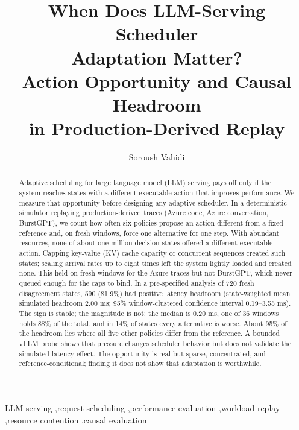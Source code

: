 \documentclass[preprint,12pt]{elsarticle}
\begin{document}
\newcommand{\anwg}{\mathrm{ANWG}}
\newcommand{\sbs}{\mathrm{SBS}}
\newcommand{\vbs}{\mathrm{VBS}}
\newcommand{\policy}[1]{\texttt{\detokenize{#1}}}

\begin{frontmatter}

\title{When Does LLM-Serving Scheduler\\
Adaptation Matter?\\
Action Opportunity and Causal Headroom\\
in Production-Derived Replay}

\author{Soroush Vahidi}

\address{Department of Computer Science, Ying Wu College of Computing,\\
New Jersey Institute of Technology, University Heights,\\
Newark, NJ 07102, USA}

\begin{abstract}
Adaptive scheduling for large language model (LLM) serving pays off only if the system reaches states with a different executable action that improves performance. We measure that opportunity before designing any adaptive scheduler. In a deterministic simulator replaying production-derived traces (Azure code, Azure conversation, BurstGPT), we count how often six policies propose an action different from a fixed reference and, on fresh windows, force one alternative for one step. With abundant resources, none of about one million decision states offered a different executable action. Capping key-value (KV) cache capacity or concurrent sequences created such states; scaling arrival rates up to eight times left the system lightly loaded and created none. This held on fresh windows for the Azure traces but not BurstGPT, which never queued enough for the caps to bind. In a pre-specified analysis of 720 fresh disagreement states, 590 (81.9\%) had positive latency headroom (state-weighted mean simulated headroom 2.00 ms; 95\% window-clustered confidence interval 0.19--3.55 ms). The sign is stable; the magnitude is not: the median is 0.20 ms, one of 36 windows holds 88\% of the total, and in 14\% of states every alternative is worse. About 95\% of the headroom lies where all five other policies differ from the reference. A bounded vLLM probe shows that pressure changes scheduler behavior but does not validate the simulated latency effect. The opportunity is real but sparse, concentrated, and reference-conditional; finding it does not show that adaptation is worthwhile.
\end{abstract}

\begin{keyword}
LLM serving \sep request scheduling \sep performance evaluation \sep workload replay \sep resource contention \sep causal evaluation
\end{keyword}

\end{frontmatter}
\end{document}
